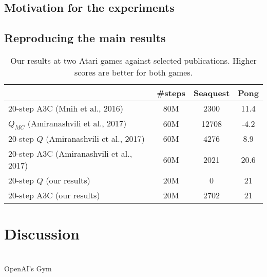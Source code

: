 \documentclass{article}
\begin{document}
\subsection{Motivation for the experiments}
\subsection{Reproducing the main results}


\begin{table}
\centering
\label{table1}
    \begin{tabular}{@{}l|c|cc}
    \toprule
                                             & \#steps     & Seaquest       & Pong            \\ \midrule
    20-step A3C (Mnih et al., 2016)          & 80M         & 2300           & 11.4            \\ \midrule
    $Q_{MC}$ (Amiranashvili et al., 2017)    & 60M         & 12708          & -4.2            \\
    20-step $Q$ (Amiranashvili et al., 2017) & 60M         & 4276           & 8.9             \\
    20-step A3C (Amiranashvili et al., 2017) & 60M         & 2021           & 20.6            \\ \midrule
    20-step $Q$ (our results)                & 20M         & 0              & 21              \\
    20-step A3C (our results)                & 20M         & 2702           & 21              \\ \bottomrule
    \end{tabular}
\caption{Our results at two Atari games against selected publications. Higher scores are better for both games.}
\end{table}

\section{Discussion}


\citet{mnih2015} \\
OpenAI's Gym \citep{gym} \\
\citep{pytorch} \\
\citet{amiranashvili2018analyzing} \\
\citet{pmlr-v48-mniha16}

\pagebreak

\small


\end{document}
